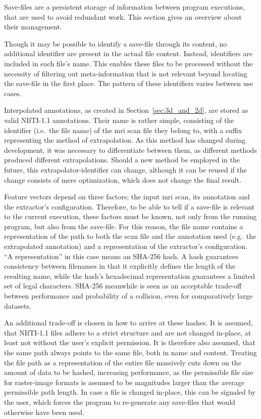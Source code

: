 Save-files are a persistent storage of information between program executions, 
that are used to avoid redundant work. This section gives an overview about 
their management.

Though it may be possible to identify a save-file through its content, no 
additional identifier are present in the actual file content. Instead, 
identifiers are included in each file's name. This enables these files to be 
processed without the necessity of filtering out meta-information that is not 
relevant beyond locating the save-file in the first place. The pattern of these
identifiers varies between use cases.

Interpolated annotations, as created in Section~\ref{sec:3d_and_2d}, are stored 
as valid NIfTI-1.1 annotations. Their name is rather simple, consisting of 
the identifier (i.e.~the file name) of the \ac{mri} scan file they belong to,
with a suffix representing the method of extrapolation. As this method has 
changed during development, it was necessary to differentiate between them, as
different methods produced different extrapolations. Should a new method be 
employed in the future, this extrapolator-identifier can change, although it 
can be reused if the change consists of mere optimization, which does not change
the final result.

Feature vectors depend on three factors; the input \ac{mri} scan, its annotation
and the extractor's configuration. Therefore, to be able to tell if a save-file
is relevant to the current execution, these factors must be known, not only from
the running program, but also from the save-file. For this reason, the file name 
contains a representation of the path to both the scan file and the annotation 
used (e.g.~the extrapolated annotation) and a representation of the extractor's 
configuration. \enquote{A representation} in this case means an SHA-256 hash. 
A hash guarantees consistency between filenames in that it explicitly defines
the length of the resulting name, while the hash's hexadecimal representation
guarantees a limited set of legal characters. SHA-256 meanwhile is seen as an
acceptable trade-off between performance and probability of a collision, even
for comparatively large datasets. 

An additional trade-off is chosen in how to arrive at these hashes. It is 
assumed, that NIfTI-1.1 files adhere to a strict structure and are not changed
in-place, at least not without the user's explicit permission. It is therefore
also assumed, that the same path always points to the same file, both in name
and content. Treating the file path as a representation of the entire file 
massively cuts down on the amount of data to be hashed, increasing performance,
as the permissible file size for raster-image formats is assumed to be 
magnitudes larger than the average permissible path length.
In case a file is changed in-place, this can be signaled by the user, which 
forces the program to re-generate any save-files that would otherwise have been
used.

